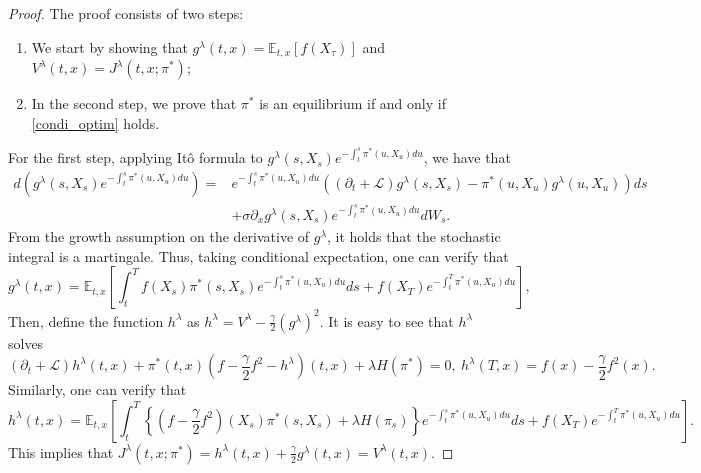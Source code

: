 \documentclass[11pt]{article}
\begin{document}
\begin{proof}
	The proof consists of two steps:
	\begin{enumerate}
		\item We start by showing that $g^\lambda(t,x)= \mathbb E_{t,x}[f(X_\tau)]$ and $V^\lambda(t,x)=J^\lambda(t,x;\pi^*)$;
		\item In the second step, we prove that $\pi^*$ is an equilibrium if and only if  \eqref{condi_optim} holds. 
	\end{enumerate}
For the first step, applying It\^o formula to $g^\lambda(s,X_s)e^{-\int_t^s \pi^*(u,X_u)du}$, we have that 
\begin{equation*}
\begin{split}
d\left(g^\lambda(s,X_s)e^{-\int_t^s \pi^*(u,X_u)du}\right)=&e^{-\int_t^s \pi^*(u,X_u)du}\left((\partial_t+\mathcal L)g^\lambda(s,X_s)-\pi^*(u,X_u)g^\lambda(u,X_u)\right)ds\\
&+\sigma \partial_x g^\lambda(s,X_s)e^{-\int_t^s \pi^*(u,X_u)du} dW_s.
\end{split}
\end{equation*}
From the growth assumption on the derivative of $g^\lambda$, it holds that the stochastic integral is a martingale. Thus, taking conditional expectation, one can verify that    
$$
g^\lambda(t,x)=\mathbb E_{t,x}\left[\int_t^T f(X_s)\pi^*(s,X_s)e^{-\int_t^s \pi^*(u,X_u) du}ds+f(X_T)e^{-\int_t^T \pi^*(u,X_u) du}\right],
$$
Then, define the function $h^\lambda$ as  $h^\lambda=V^\lambda-\frac\gamma2 (g^\lambda)^2$. It is easy to see that $h^\lambda$ solves
$$
(\partial_t +\mathcal L) h^\lambda(t,x)+\pi^*(t,x)(f-\frac{\gamma}{2}f^2-h^\lambda)(t,x)+\lambda H(\pi^*)=0,\ h^\lambda(T,x)=f(x)-\frac{\gamma}{2}f^2(x).
$$
Similarly, one can verify that 
$$
h^\lambda(t,x)=\mathbb E_{t,x}\left[\int_t^T \left\{(f-\frac{\gamma}{2}f^2)(X_s)\pi^*(s,X_s)+\lambda H(\pi_s) \right\}e^{-\int_t^s \pi^*(u,X_u) du}ds+f(X_T)e^{-\int_t^T\pi^*(u,X_u) du}\right].
$$
This implies that $J^\lambda(t,x;\pi^*)=h^\lambda(t,x)+\frac{\gamma}{2}g^\lambda(t,x)=V^\lambda(t,x)$.


\end{proof}
\end{document}
